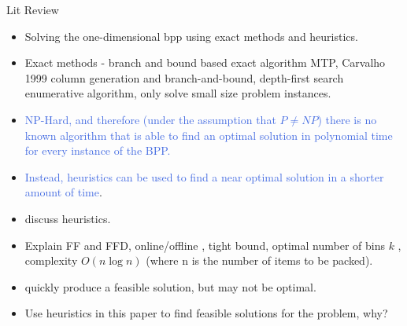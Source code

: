 \documentclass[oribibl]{llncs}
\begin{document}
Lit Review
\begin{itemize}
	\item Solving the one-dimensional bpp using exact methods and heuristics.
	\item Exact methods - \cite{martello1990a} branch and bound based exact algorithm MTP, Carvalho 1999 column generation and branch-and-bound, \cite{eilon1971} depth-first search enumerative algorithm, only solve small size problem instances.
	\item \cite{garey1979} \textcolor{RoyalBlue}{NP-Hard, and therefore (under the assumption that $P \neq NP$) there is no known algorithm that is able to find an optimal solution in polynomial time for every instance of the BPP.}
	\item \textcolor{RoyalBlue}{Instead, heuristics can be used to find a near optimal solution in a shorter amount of time}.
	\item discuss heuristics.
	\item Explain FF and FFD, online/offline \cite{eilon1971}, \cite{dosa2007} tight bound, optimal number of bins $k$ \cite{korf2002}, complexity $O(n \log n)$ \cite{coffman1984} (where n is the number of items to be packed).
	\item quickly produce a feasible solution, but may not be optimal.
	\item Use heuristics in this paper to find feasible solutions for the problem, why?
\end{itemize}
\end{document}
